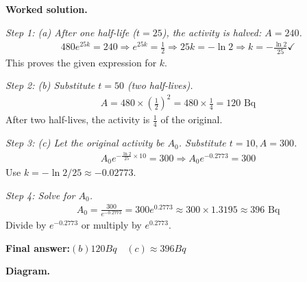 \documentclass[11pt]{article}
\begin{document}
\textbf{Worked solution.}

\textit{Step 1: (a) After one half-life (\( t = 25 \)), the activity is halved: \( A = 240 \).}
\[\begin{gathered}
480e^{25k} = 240 \Rightarrow e^{25k} = \frac{1}{2} \Rightarrow 25k = -\ln 2 \Rightarrow k = -\frac{\ln 2}{25} \checkmark
\end{gathered}\]
This proves the given expression for \( k \).

\textit{Step 2: (b) Substitute \( t = 50 \) (two half-lives).}
\[\begin{gathered}
A = 480 \times \left(\frac{1}{2}\right)^2 = 480 \times \frac{1}{4} = 120 \text{ Bq}
\end{gathered}\]
After two half-lives, the activity is $\frac{1}{4}$ of the original.

\textit{Step 3: (c) Let the original activity be \( A_0 \). Substitute \( t = 10, A = 300 \).}
\[\begin{gathered}
A_0 e^{-\frac{\ln 2}{25} \times 10} = 300 \Rightarrow A_0 e^{-0.2773} = 300
\end{gathered}\]
Use \( k = -\ln 2 / 25 \approx -0.02773 \).

\textit{Step 4: Solve for \( A_0 \).}
\[\begin{gathered}
A_0 = \frac{300}{e^{-0.2773}} = 300e^{0.2773} \approx 300 \times 1.3195 \approx 396 \text{ Bq}
\end{gathered}\]
Divide by \( e^{-0.2773} \) or multiply by \( e^{0.2773} \).

\begin{answerbox}
\textbf{Final answer:}\quad \(\displaystyle (b) 120 Bq \quad  (c) \approx 396 Bq\)
\end{answerbox}
\textbf{Diagram.}
\end{document}
